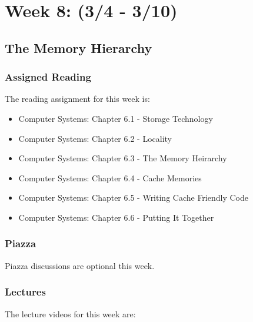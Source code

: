\clearpage

\renewcommand{\ChapTitle}{Week 8: (3/4 - 3/10)}
\renewcommand{\SectionTitle}{The Memory Hierarchy}

\chapter{\ChapTitle}

\section{\SectionTitle}

\subsection{Assigned Reading}

The reading assignment for this week is:

\begin{itemize}
    \item Computer Systems: Chapter 6.1 - Storage Technology
    \item Computer Systems: Chapter 6.2 - Locality
    \item Computer Systems: Chapter 6.3 - The Memory Heirarchy
    \item Computer Systems: Chapter 6.4 - Cache Memories
    \item Computer Systems: Chapter 6.5 - Writing Cache Friendly Code
    \item Computer Systems: Chapter 6.6 - Putting It Together
\end{itemize}

\subsection{Piazza}

Piazza discussions are optional this week. 

\subsection{Lectures}

The lecture videos for this week are:

